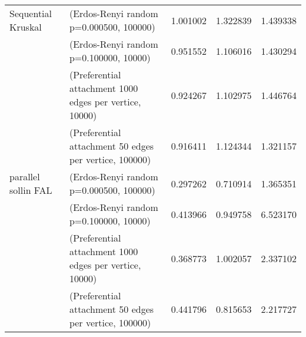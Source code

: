 \begin{tabular}{llrrr}
Sequential Kruskal & (Erdos-Renyi random p=0.000500, 100000) &  1.001002 &  1.322839 &  1.439338 \\
                    & (Erdos-Renyi random p=0.100000, 10000) &  0.951552 &  1.106016 &  1.430294 \\
                    & (Preferential attachment 1000 edges per vertice, 10000) &  0.924267 &  1.102975 &  1.446764 \\
                    & (Preferential attachment 50 edges per vertice, 100000) &  0.916411 &  1.124344 &  1.321157 \\
parallel sollin FAL & (Erdos-Renyi random p=0.000500, 100000) &  0.297262 &  0.710914 &  1.365351 \\
                    & (Erdos-Renyi random p=0.100000, 10000) &  0.413966 &  0.949758 &  6.523170 \\
                    & (Preferential attachment 1000 edges per vertice, 10000) &  0.368773 &  1.002057 &  2.337102 \\
                    & (Preferential attachment 50 edges per vertice, 100000) &  0.441796 &  0.815653 &  2.217727 \\
\bottomrule
\end{tabular}
